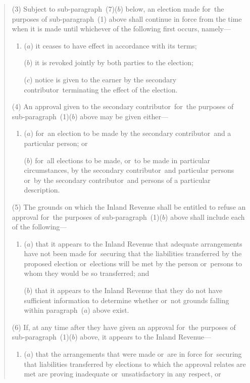 \documentclass[12pt,a4paper]{article}
\begin{document}
\begin{quotation}
(3) Subject to sub-paragraph~(7)($b$)  below, an election made for~the purposes of sub-paragraph~(1)  above shall continue in force from the time when it is made until whichever of the following first occurs, namely—
\begin{enumerate}\item[]
($a$) it ceases to have effect in accordance with its terms;

($b$) it is revoked jointly by both parties to the election;

($c$) notice is given to the earner by the secondary contributor~terminating the effect of the election.
\end{enumerate}

(4) An approval given to the secondary contributor~for~the purposes of sub-paragraph~(1)($b$)  above may be given either—
\begin{enumerate}\item[]
($a$) for~an election to be made by the secondary contributor~and a particular person; or

($b$) for~all elections to be made, or~to be made in particular circumstances, by the secondary contributor~and particular persons or~by the secondary contributor~and persons of a particular description.
\end{enumerate}

(5) The grounds on which the Inland Revenue shall be entitled to refuse an approval for~the purposes of sub-paragraph~(1)($b$)  above shall include each of the following—
\begin{enumerate}\item[]
($a$) that it appears to the Inland Revenue that adequate arrangements have not been made for~securing that the liabilities transferred by the proposed election or~elections will be met by the person or~persons to whom they would be so transferred; and

($b$) that it appears to the Inland Revenue that they do not have sufficient information to determine whether or~not grounds falling within paragraph~($a$)  above exist.
\end{enumerate}

(6) If, at any time after they have given an approval for~the purposes of sub-paragraph~(1)($b$)  above, it appears to the Inland Revenue—
\begin{enumerate}\item[]
($a$) that the arrangements that were made or~are in force for~securing that liabilities transferred by elections to which the approval relates are met are proving inadequate or~unsatisfactory in any respect, or


\end{enumerate}
\end{quotation}
\end{document}

